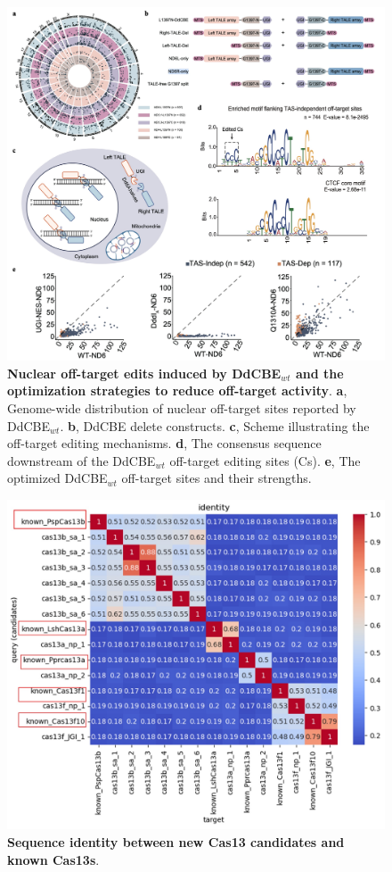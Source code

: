 \documentclass[12pt]{article}
\begin{document}
\begin{figure}[htb]
	\centering
	\includegraphics[width=1\textwidth]{figs/DdCBE_offs.jpg} 
	\caption{\textbf{Nuclear off-target edits induced by DdCBE$_{wt}$ and the optimization strategies to reduce off-target activity}.
    \textbf{a}, Genome-wide distribution of nuclear off-target sites reported by DdCBE$_{wt}$.
    \textbf{b}, DdCBE delete constructs.
    \textbf{c}, Scheme illustrating the off-target editing mechanisms.
    \textbf{d}, The consensus sequence downstream of the DdCBE$_{wt}$ off-target editing sites (Cs).
    \textbf{e}, The optimized DdCBE$_{wt}$ off-target sites and their strengths.}
	\label{fig:DdCBE_offs}
\end{figure}

\begin{figure}[htb]
	\centering
	\includegraphics[width=1\textwidth]{figs/Cas13_identity.jpg} 
	\caption{\textbf{Sequence identity between new Cas13 candidates and known Cas13s}.}
	\label{fig:Cas13_identity}
\end{figure}
\end{document}
